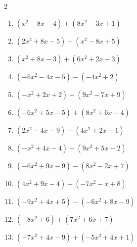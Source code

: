 \begin{multicols}{2}
\begin{enumerate}

  \item $(x^{2}-8x-4)+(8x^{2}-3x+1)$


  \item $(2x^{2}+8x-5)-(x^{2}-8x+5)$


  \item $(x^{2}+8x-3)+(6x^{2}+2x-3)$


  \item $(-6x^{2}-4x-5)-(-4x^{2}+2)$


  \item $(-x^{2}+2x+2)+(9x^{2}-7x+9)$


\columnbreak %

  \item $(-6x^{2}+5x-5)+(8x^{2}+6x-4)$


  \item $(2x^{2}-4x-9)+(4x^{2}+2x-1)$


  \item $(-x^{2}+4x-4)+(9x^{2}+5x-2)$


  \item $(-6x^{2}+9x-9)-(8x^{2}-2x+7)$


  \item $(4x^{2}+9x-4)+(-7x^{2}-x+8)$


  \item $(-9x^{2}+4x+5)-(-6x^{2}+8x-9)$


  \item $(-8x^{2}+6)+(7x^{2}+6x+7)$


  \item $(-7x^{2}+4x-9)+(-5x^{2}+4x+1)$



\end{enumerate}
\end{multicols}
